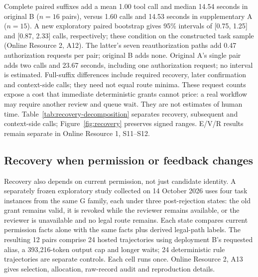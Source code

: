 \documentclass[pdflatex,sn-basic]{sn-jnl}
\begin{document}
Complete paired suffixes add a mean 1.00 tool call and median 14.54 seconds in original B ($n=16$ pairs), versus 1.60 calls and 14.53 seconds in supplementary A ($n=15$). A new exploratory paired bootstrap gives 95\% intervals of {[}0.75, 1.25{]} and {[}0.87, 2.33{]} calls, respectively; these condition on the constructed task sample (Online Resource 2, A12). The latter's seven reauthorization paths add 0.47 authorization requests per pair; original B adds none. Original A's single pair adds two calls and 23.67 seconds, including one authorization request; no interval is estimated. Full-suffix differences include required recovery, later confirmation and context-side calls; they need not equal route minima. These request counts expose a cost that immediate deterministic grants cannot price: a real workflow may require another review and queue wait. They are not estimates of human time. Table~\ref{tab:recovery-decomposition} separates recovery, subsequent and context-side calls; Figure~\ref{fig:recovery} preserves signed ranges. E/V/R results remain separate in Online Resource 1, S11--S12.

\subsection{Recovery when permission or feedback changes}\label{feedback-sensitivity}

Recovery also depends on current permission, not just candidate identity. A separately frozen exploratory study collected on 14 October 2026 uses four task instances from the same G family, each under three post-rejection states: the old grant remains valid, it is revoked while the reviewer remains available, or the reviewer is unavailable and no legal route remains. Each state compares current permission facts alone with the same facts plus derived legal-path labels. The resulting 12 pairs comprise 24 hosted trajectories using deployment B's requested alias, a 393,216-token output cap and longer waits; 24 deterministic rule trajectories are separate controls. Each cell runs once. Online Resource 2, A13 gives selection, allocation, raw-record audit and reproduction details.
\end{document}
